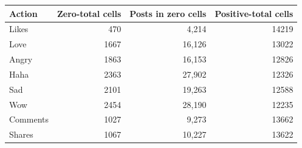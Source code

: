 \begin{tabular}{lrrr}
\toprule
Action & Zero-total cells & Posts in zero cells & Positive-total cells \\
\midrule
Likes & 470 & 4,214 & 14219 \\
Love & 1667 & 16,126 & 13022 \\
Angry & 1863 & 16,153 & 12826 \\
Haha & 2363 & 27,902 & 12326 \\
Sad & 2101 & 19,263 & 12588 \\
Wow & 2454 & 28,190 & 12235 \\
Comments & 1027 & 9,273 & 13662 \\
Shares & 1067 & 10,227 & 13622 \\
\bottomrule
\end{tabular}
